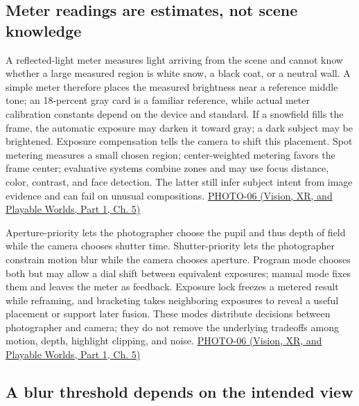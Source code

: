 \subsection{Meter readings are estimates, not scene knowledge}\label{03-visual-computing-i-ch003-meter-readings-are-estimates-not-scene-knowledge}

\hypertarget{03-visual-computing-i-ch003-meter-readings-are-estimates-not-scene-knowledge}{}

A reflected-light meter measures light arriving from the scene and cannot know whether a large measured region is white snow, a black coat, or a neutral wall. A simple meter therefore places the measured brightness near a reference middle tone; an 18-percent gray card is a familiar reference, while actual meter calibration constants depend on the device and standard. If a snowfield fills the frame, the automatic exposure may darken it toward gray; a dark subject may be brightened. Exposure compensation tells the camera to shift this placement. Spot metering measures a small chosen region; center-weighted metering favors the frame center; evaluative systems combine zones and may use focus distance, color, contrast, and face detection. The latter still infer subject intent from image evidence and can fail on unusual compositions. \href{../07-Vision-XR-and-Playable-Worlds-P01/main.pdf\#nameddest=04-visual-computing-ii-ch036-photo-06---photography-session-06}{PHOTO-06 (Vision, XR, and Playable Worlds, Part 1, Ch. 5)}

Aperture-priority lets the photographer choose the pupil and thus depth of field while the camera chooses shutter time. Shutter-priority lets the photographer constrain motion blur while the camera chooses aperture. Program mode chooses both but may allow a dial shift between equivalent exposures; manual mode fixes them and leaves the meter as feedback. Exposure lock freezes a metered result while reframing, and bracketing takes neighboring exposures to reveal a useful placement or support later fusion. These modes distribute decisions between photographer and camera; they do not remove the underlying tradeoffs among motion, depth, highlight clipping, and noise. \href{../07-Vision-XR-and-Playable-Worlds-P01/main.pdf\#nameddest=04-visual-computing-ii-ch036-photo-06---photography-session-06}{PHOTO-06 (Vision, XR, and Playable Worlds, Part 1, Ch. 5)}

\subsection{A blur threshold depends on the intended view}\label{03-visual-computing-i-ch003-a-blur-threshold-depends-on-the-intended-view}


